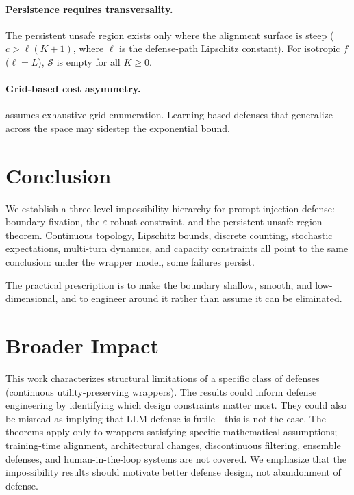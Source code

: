 \documentclass[11pt]{article}
\begin{document}
\paragraph{Persistence requires transversality.}
The persistent unsafe region exists only where the alignment surface
is steep ($c > \ell(K+1)$, where $\ell$ is the defense-path
Lipschitz constant). For isotropic $f$ ($\ell = L$), $\mathcal{S}$
is empty for all $K \geq 0$.

\paragraph{Grid-based cost asymmetry.}
 assumes exhaustive grid enumeration. Learning-based
defenses that generalize across the space may sidestep the exponential
bound.


\section{Conclusion}
\label{sec:conclusion}

We establish a three-level impossibility hierarchy for prompt-injection
defense: boundary fixation, the $\varepsilon$-robust constraint, and the
persistent unsafe region theorem. Continuous topology, Lipschitz bounds,
discrete counting, stochastic expectations, multi-turn dynamics, and
capacity constraints all point to the same conclusion: under the
wrapper model, some failures persist. 

The practical prescription is to make the boundary shallow, smooth,
and low-dimensional, and to engineer around it rather than assume it
can be eliminated.

\section*{Broader Impact}
This work characterizes structural limitations of a specific class
of defenses (continuous utility-preserving wrappers). The results
could inform defense engineering by identifying which design
constraints matter most. They could also be misread as implying
that LLM defense is futile---this is not the case. The theorems
apply only to wrappers satisfying specific mathematical assumptions;
training-time alignment, architectural changes, discontinuous
filtering, ensemble defenses, and human-in-the-loop systems are
not covered. We emphasize that the impossibility results should
motivate better defense design, not abandonment of defense.
\end{document}
